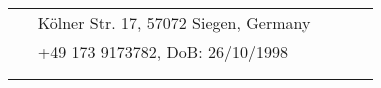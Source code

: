 \documentclass[10pt]{article} %
\begin{document}
\begin{paracol}{2}
\switchcolumn %


\parbox[top][0.12\textheight][c]{\linewidth}{ %
	\vspace{-0.04\textheight} %
	\colorbox{shade}{ %
		\begin{supertabular}{p{0.05\linewidth}|p{0.795\linewidth}} %
            \raisebox{-1pt}{\faHome} & K\"{o}lner Str. 17, 57072 Siegen, Germany \\ %
			\raisebox{-1pt}{\faPhone} & +49 173 9173782, DoB: 26/10/1998 \\ %
            \raisebox{0pt}{\small\faEnvelope} & \\%
            \raisebox{0pt}{\faGithub} & \\ %
		\end{supertabular}
	}
}



\end{paracol}
\end{document}
